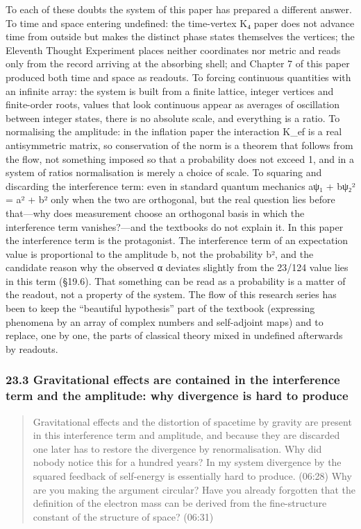 \documentclass[
  a4paper,
]{article}
\begin{document}
To each of these doubts the system of this paper has prepared a
different answer. To time and space entering undefined: the time-vertex
K₄ paper does not advance time from outside but makes the distinct phase
states themselves the vertices; the Eleventh Thought Experiment places
neither coordinates nor metric and reads only from the record arriving
at the absorbing shell; and Chapter 7 of this paper produced both time
and space as readouts. To forcing continuous quantities with an infinite
array: the system is built from a finite lattice, integer vertices and
finite-order roots, values that look continuous appear as averages of
oscillation between integer states, there is no absolute scale, and
everything is a ratio. To normalising the amplitude: in the inflation
paper the interaction K\_ef is a real antisymmetric matrix, so
conservation of the norm is a theorem that follows from the flow, not
something imposed so that a probability does not exceed 1, and in a
system of ratios normalisation is merely a choice of scale. To squaring
and discarding the interference term: even in standard quantum mechanics
\textbar aψ₁ + bψ₂\textbar² = \textbar a\textbar² + \textbar b\textbar²
only when the two are orthogonal, but the real question lies before
that---why does measurement choose an orthogonal basis in which the
interference term vanishes?---and the textbooks do not explain it. In
this paper the interference term is the protagonist. The interference
term of an expectation value is proportional to the amplitude b, not the
probability \textbar b\textbar², and the candidate reason why the
observed α deviates slightly from the 23/124 value lies in this term
(§19.6). That something can be read as a probability is a matter of the
readout, not a property of the system. The flow of this research series
has been to keep the ``beautiful hypothesis'' part of the textbook
(expressing phenomena by an array of complex numbers and self-adjoint
maps) and to replace, one by one, the parts of classical theory mixed in
undefined afterwards by readouts.

\subsubsection{23.3 Gravitational effects are contained in the
interference term and the amplitude: why divergence is hard to
produce}\label{gravitational-effects-are-contained-in-the-interference-term-and-the-amplitude-why-divergence-is-hard-to-produce}

\begin{quote}
Gravitational effects and the distortion of spacetime by gravity are
present in this interference term and amplitude, and because they are
discarded one later has to restore the divergence by renormalisation.
Why did nobody notice this for a hundred years? In my system divergence
by the squared feedback of self-energy is essentially hard to produce.
(06:28) Why are you making the argument circular? Have you already
forgotten that the definition of the electron mass can be derived from
the fine-structure constant of the structure of space? (06:31)
\end{quote}
\end{document}
